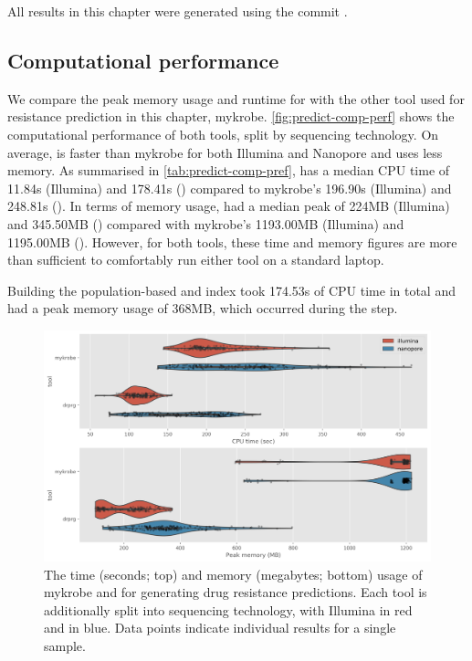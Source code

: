 \noindent
All \drprg{} results in this chapter were generated using the commit \href{https://github.com/mbhall88/drprg/tree/cb4f9b82b5d03de45b8016ae5d54bbce7a8f3a0f}{}.

\subsection{Computational performance}

We compare the peak memory usage and runtime for \drprg{}  with the other tool used for resistance prediction in this chapter, mykrobe. \autoref{fig:predict-comp-perf} shows the computational performance of both tools, split by sequencing technology. On average, \drprg{} is faster than mykrobe for both Illumina and Nanopore and uses less memory. As summarised in \autoref{tab:predict-comp-pref}, \drprg{} has a median CPU time of 11.84s (Illumina) and 178.41s (\ont{}) compared to mykrobe's 196.90s (Illumina) and 248.81s (\ont{}). In terms of memory usage, \drprg{} had a median peak of 224MB (Illumina) and 345.50MB (\ont{}) compared with mykrobe's 1193.00MB (Illumina) and 1195.00MB (\ont{}). However, for both tools, these time and memory figures are more than sufficient to comfortably run either tool on a standard laptop. 

Building the \drprg{} population-based \prg{} and index took 174.53s of CPU time in total and had a peak memory usage of 368MB, which occurred during the \makeprg{} step.

\begin{figure}
\begin{center}
\includegraphics[width=0.90\columnwidth]{Chapter3/Figs/predict-comp-perf.png}
\caption{{The time (seconds; top) and memory (megabytes; bottom) usage of mykrobe and \drprg{} for generating drug resistance predictions. Each tool is additionally split into sequencing technology, with Illumina in red and \ont{} in blue. Data points indicate individual results for a single sample.
{\label{fig:predict-comp-perf}}
}}
\end{center}
\end{figure}


